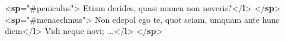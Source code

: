 \begin{shaded}
{<\textbf{sp}\hspace*{1em}{who}="{\#peniculus}">}\mbox{}\newline 
{}Etiam derides, quasi nomen non noveris?{</\textbf{l}>}\mbox{}\newline 
{</\textbf{sp}>}\mbox{}\newline 
{<\textbf{sp}\hspace*{1em}{who}="{\#menaechmus}">}\mbox{}\newline 
{}Non edepol ego te, quot sciam, umquam ante hunc diem{</\textbf{l}>}\mbox{}\newline 
{}Vidi neque novi; ...{</\textbf{l}>}\mbox{}\newline 
{</\textbf{sp}>}\end{shaded}\egroup\par \noindent  \par
